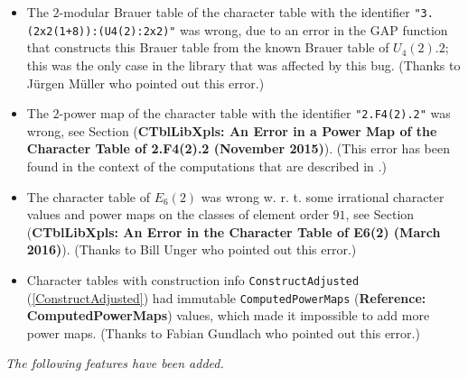 \documentclass[a4paper,11pt]{report}
\begin{document}
{{{ 
\begin{itemize}
\item  The $2$-modular Brauer table of the character table with the identifier \texttt{"3.(2x2\texttt{}(1+8)):(U4(2):2x2)"} was wrong, due to an error in the \textsf{GAP} function that constructs this Brauer table from the known Brauer table of $U_4(2).2$; this was the only case in the library that was affected by this bug. (Thanks
to J{\"u}rgen M{\"u}ller who pointed out this error.)  
\item  The $2$-power map of the character table with the identifier \texttt{"2.F4(2).2"} was wrong,  see Section  (\textbf{CTblLibXpls: An Error in a Power Map of the Character Table of 2.F{\textunderscore}4(2).2 (November 2015)}). (This error has been found in the context of the computations that are
described in \cite{BMO17}.) 
\item  The character table of $E_6(2)$ was wrong w. r. t. some irrational character values and power maps on the
classes of element order $91$,  see Section  (\textbf{CTblLibXpls: An Error in the Character Table of E{\textunderscore}6(2) (March 2016)}).  (Thanks to Bill Unger who pointed out this error.)  
\item  Character tables with construction info \texttt{ConstructAdjusted} (\ref{ConstructAdjusted}) had immutable \texttt{ComputedPowerMaps} (\textbf{Reference: ComputedPowerMaps}) values, which made it impossible to add more power maps. (Thanks to Fabian
Gundlach who pointed out this error.)  
\end{itemize}
 

 \emph{The following features have been added.} 

}}}
\end{document}

